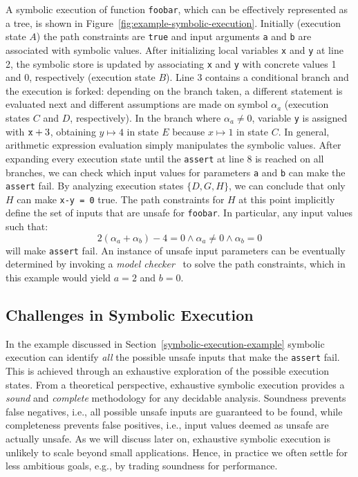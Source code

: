 \noindent A symbolic execution of function {\tt foobar}, which can be effectively represented as a tree, is shown in Figure~\ref{fig:example-symbolic-execution}. Initially (execution state $A$) the path constraints are {\tt true} and input arguments {\tt a} and {\tt b} are associated with symbolic values. 
After initializing local variables {\tt x} and {\tt y} at line 2, the symbolic store is updated by associating {\tt x} and {\tt y} with concrete values 1 and 0, respectively (execution state $B$). Line 3 contains a conditional branch and the execution is forked: depending on the branch taken, a different statement is evaluated next and different assumptions are made on symbol $\alpha_a$ (execution states $C$ and $D$, respectively). In the branch where $\alpha_a\neq 0$, variable {\tt y} is assigned with ${\tt x}+3$, obtaining $y\mapsto 4$ in state $E$ because $x\mapsto 1$ in state $C$. In general, arithmetic expression evaluation simply manipulates the symbolic values.
After expanding every execution state until the {\tt assert} at line 8 is reached on all branches, we can check which input values for parameters {\tt a} and {\tt b} can make the {\tt assert} fail. By analyzing execution states $\{D,G,H\}$, we can conclude that only $H$ can make {\tt x-y = 0} true. The path constraints for $H$ at this point implicitly define the set of inputs that are unsafe for {\tt foobar}. 
In particular, any input values such that:
 \[ 2(\alpha_a+\alpha_b)-4 = 0 \wedge \alpha_a \neq 0 \wedge \alpha_b = 0 \]
will make {\tt assert} fail. An instance of unsafe input parameters can be eventually determined by invoking a {\em model checker}~\cite{HandbookOfSAT2009} to solve the path constraints, which in this example would yield $a = 2$ and $b = 0$. 


\subsection{Challenges in Symbolic Execution}
\label{example-discussion}

In the example discussed in Section~\ref{symbolic-execution-example} symbolic execution can identify {\em all} the possible unsafe inputs that make the {\tt assert} fail. This is achieved through an exhaustive exploration of the possible execution states. From a theoretical perspective, exhaustive symbolic execution provides a {\em sound} and {\em complete} methodology for any decidable analysis. Soundness prevents false negatives, i.e., all possible unsafe inputs are guaranteed to be found, while completeness prevents false positives, i.e.,  input values deemed as unsafe are actually unsafe. As we will discuss later on, exhaustive symbolic execution is unlikely to scale beyond small applications. Hence, in practice we often settle for less ambitious goals, e.g., by trading soundness for performance.

